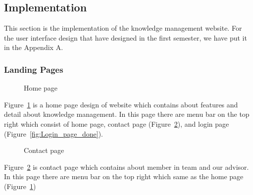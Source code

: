 \documentclass[12pt,oneside,openright,a4paper]{cpe-english-project}
\begin{document}
	\subsection{Implementation}
	This section is the implementation of the knowledge management website.
	For the user interface design that have designed in the first semester,
	we have put it in the Appendix A.

	\subsubsection{Landing Pages}
		\begin{figure}[!h]\centering
			\caption{Home page}\label{fig:Home_page_done}
		\end{figure}
		\begin{flushleft}
			Figure~\ref*{fig:Home_page_done} is a home page design of website which contains about features and detail about knowledge management. In this page there are menu bar on the top right which consist of home page, contact page (Figure~\ref*{fig:Contact_page_done}), and login page (Figure~\ref*{fig:Login_page_done}).
		\end{flushleft}

		\begin{figure}[!h]\centering
			\caption{Contact page}\label{fig:Contact_page_done}
		\end{figure}
		\begin{flushleft}
			Figure~\ref*{fig:Contact_page_done} is contact page which contains about member in team and our advisor. In this page there are menu bar on the top right which same as the home page (Figure~\ref*{fig:Home_page_done})
		\end{flushleft}
\end{document}
